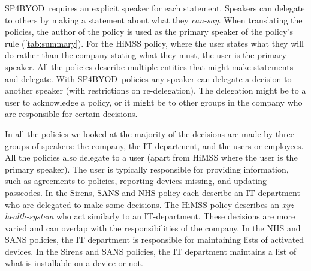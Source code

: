 \documentclass{llncs}
\newcommand{\AppPAL}[0]{SP4BYOD}
\begin{document}
\AppPAL~requires an explicit speaker for each statement.
Speakers can delegate to others by making a statement about what they \emph{can-say}.
When translating the policies, the author of the policy is used as the primary speaker of the policy's rule (\autoref{tab:summary}).
For the \ac{HiMSS} policy, where the user states what they will do rather than the company stating what they must, the user is the primary speaker.
All the policies describe multiple entities that might make statements and delegate.
With \AppPAL~policies any speaker can delegate a decision to another speaker (with restrictions on re-delegation).
The delegation might be to a user to acknowledge a policy, or it might be to other groups in the company who are responsible for certain decisions.

In all the policies we looked at the majority of the decisions are made by three groups of speakers: 
  the company, the IT-department, and the users or employees.
All the policies also delegate to a user (apart from \ac{HiMSS} where the user is the primary speaker).
The user is typically responsible for providing information, such as agreements to policies, reporting devices missing, and updating passcodes.
In the Sirens, SANS and NHS policy each describe an IT-department who are delegated to make some decisions.
The \ac{HiMSS} policy describes an \emph{xyz-health-system} who act similarly to an IT-department.
These decisions are more varied and can overlap with the responsibilities of the company.
In the NHS and SANS policies, the IT department is responsible for maintaining lists of activated devices.
In the Sirens and SANS policies, the IT department maintains a list of what is installable on a device or not.

\end{document}
